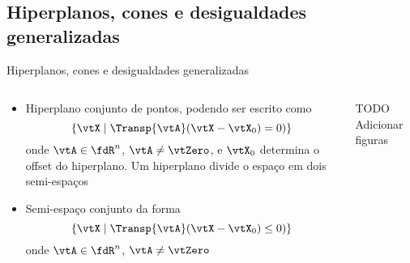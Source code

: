 \subsection{Hiperplanos, cones e desigualdades generalizadas}

\begin{frame}{Hiperplanos, cones e desigualdades generalizadas}
  \begin{columns}
    \begin{column}{0.48\linewidth}
      \begin{itemize}
        \item Hiperplano  conjunto de pontos, podendo ser escrito como
        \begin{equation}\label{eq_hiperplano}
        \{ \vtX \mid \Transp{\vtA}(\vtX-\vtX_{0}) = 0) \}
        \end{equation}
        onde $ \vtA \in \fdR^n$, $ \vtA \neq \vtZero$, e $\vtX_{0}$ determina o offset do hiperplano. Um hiperplano divide o espaço em dois semi-espaços
        
        \item Semi-espaço  conjunto da forma  
        \begin{equation}\label{eq_halfspace}
        \{ \vtX \mid \Transp{\vtA}(\vtX-\vtX_{0}) \leq 0) \}
        \end{equation}
        onde $ \vtA \in \fdR^n$, $ \vtA \neq \vtZero$
      \end{itemize} 
    \end{column}

    \hfill

    \begin{column}{0.48\linewidth}
      \begin{block}{TODO}
        Adicionar figuras
      \end{block}
    \end{column}
  \end{columns}
\end{frame}

